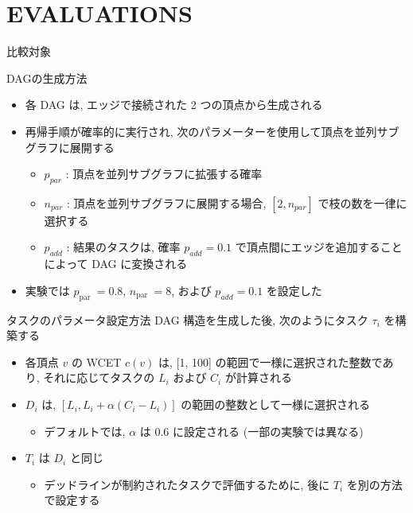 
\section{EVALUATIONS}
\label{sec: evaluations}

\begin{frame}{比較対象}
\end{frame}

\begin{frame}{DAGの生成方法}
    \begin{itemize}
        \item 各 DAG は, エッジで接続された 2 つの頂点から生成される
        \item 再帰手順が確率的に実行され, 次のパラメーターを使用して頂点を並列サブグラフに展開する
              \begin{itemize}
                  \item  $p_{p a r}$ : 頂点を並列サブグラフに拡張する確率

                  \item  $n_{par}$ : 頂点を並列サブグラフに展開する場合, $\left[2, n_{p a r}\right]$ で枝の数を一律に選択する

                  \item  $p_{a d d}$ : 結果のタスクは, 確率 $p_{a d d}=0.1$ で頂点間にエッジを追加することによって DAG に変換される

              \end{itemize}
        \item 実験では $p_{\text {par }}=0.8$, $n_{\text {par }}=8$, および $p_{a d d}=0.1$ を設定した
    \end{itemize}
\end{frame}

\begin{frame}{タスクのパラメータ設定方法}
    DAG 構造を生成した後, 次のようにタスク $\tau_{i}$ を構築する

    \begin{itemize}
        \item  各頂点 $v$ の WCET $c(v)$ は, [1, 100] の範囲で一様に選択された整数であり, それに応じてタスクの $L_{i}$ および $C_{i}$ が計算される

        \item $D_{i}$ は, $\left[L_{i}, L_{i}+\alpha\left(C_{i}-L_{i}\right)\right]$ の範囲の整数として一様に選択される
              \begin{itemize}
                  \item デフォルトでは, $\alpha$ は $0.6$ に設定される (一部の実験では異なる)
              \end{itemize}
        \item $T_{i}$ は $D_{i}$ と同じ
              \begin{itemize}
                  \item デッドラインが制約されたタスクで評価するために, 後に $T_{i}$ を別の方法で設定する
              \end{itemize}

    \end{itemize}
\end{frame}

